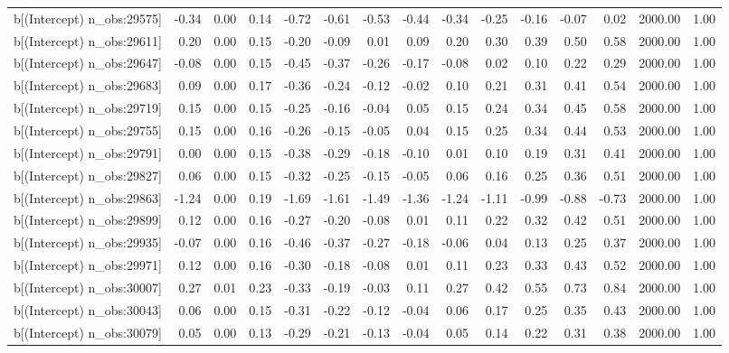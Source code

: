 \begin{table}[ht]
\begin{tabular}{rrrrrrrrrrrrrrr}
  b[(Intercept) n\_obs:29575] & -0.34 & 0.00 & 0.14 & -0.72 & -0.61 & -0.53 & -0.44 & -0.34 & -0.25 & -0.16 & -0.07 & 0.02 & 2000.00 & 1.00 \\ 
  b[(Intercept) n\_obs:29611] & 0.20 & 0.00 & 0.15 & -0.20 & -0.09 & 0.01 & 0.09 & 0.20 & 0.30 & 0.39 & 0.50 & 0.58 & 2000.00 & 1.00 \\ 
  b[(Intercept) n\_obs:29647] & -0.08 & 0.00 & 0.15 & -0.45 & -0.37 & -0.26 & -0.17 & -0.08 & 0.02 & 0.10 & 0.22 & 0.29 & 2000.00 & 1.00 \\ 
  b[(Intercept) n\_obs:29683] & 0.09 & 0.00 & 0.17 & -0.36 & -0.24 & -0.12 & -0.02 & 0.10 & 0.21 & 0.31 & 0.41 & 0.54 & 2000.00 & 1.00 \\ 
  b[(Intercept) n\_obs:29719] & 0.15 & 0.00 & 0.15 & -0.25 & -0.16 & -0.04 & 0.05 & 0.15 & 0.24 & 0.34 & 0.45 & 0.58 & 2000.00 & 1.00 \\ 
  b[(Intercept) n\_obs:29755] & 0.15 & 0.00 & 0.16 & -0.26 & -0.15 & -0.05 & 0.04 & 0.15 & 0.25 & 0.34 & 0.44 & 0.53 & 2000.00 & 1.00 \\ 
  b[(Intercept) n\_obs:29791] & 0.00 & 0.00 & 0.15 & -0.38 & -0.29 & -0.18 & -0.10 & 0.01 & 0.10 & 0.19 & 0.31 & 0.41 & 2000.00 & 1.00 \\ 
  b[(Intercept) n\_obs:29827] & 0.06 & 0.00 & 0.15 & -0.32 & -0.25 & -0.15 & -0.05 & 0.06 & 0.16 & 0.25 & 0.36 & 0.51 & 2000.00 & 1.00 \\ 
  b[(Intercept) n\_obs:29863] & -1.24 & 0.00 & 0.19 & -1.69 & -1.61 & -1.49 & -1.36 & -1.24 & -1.11 & -0.99 & -0.88 & -0.73 & 2000.00 & 1.00 \\ 
  b[(Intercept) n\_obs:29899] & 0.12 & 0.00 & 0.16 & -0.27 & -0.20 & -0.08 & 0.01 & 0.11 & 0.22 & 0.32 & 0.42 & 0.51 & 2000.00 & 1.00 \\ 
  b[(Intercept) n\_obs:29935] & -0.07 & 0.00 & 0.16 & -0.46 & -0.37 & -0.27 & -0.18 & -0.06 & 0.04 & 0.13 & 0.25 & 0.37 & 2000.00 & 1.00 \\ 
  b[(Intercept) n\_obs:29971] & 0.12 & 0.00 & 0.16 & -0.30 & -0.18 & -0.08 & 0.01 & 0.11 & 0.23 & 0.33 & 0.43 & 0.52 & 2000.00 & 1.00 \\ 
  b[(Intercept) n\_obs:30007] & 0.27 & 0.01 & 0.23 & -0.33 & -0.19 & -0.03 & 0.11 & 0.27 & 0.42 & 0.55 & 0.73 & 0.84 & 2000.00 & 1.00 \\ 
  b[(Intercept) n\_obs:30043] & 0.06 & 0.00 & 0.15 & -0.31 & -0.22 & -0.12 & -0.04 & 0.06 & 0.17 & 0.25 & 0.35 & 0.43 & 2000.00 & 1.00 \\ 
  b[(Intercept) n\_obs:30079] & 0.05 & 0.00 & 0.13 & -0.29 & -0.21 & -0.13 & -0.04 & 0.05 & 0.14 & 0.22 & 0.31 & 0.38 & 2000.00 & 1.00 \\ 

\end{tabular}
\end{table}
